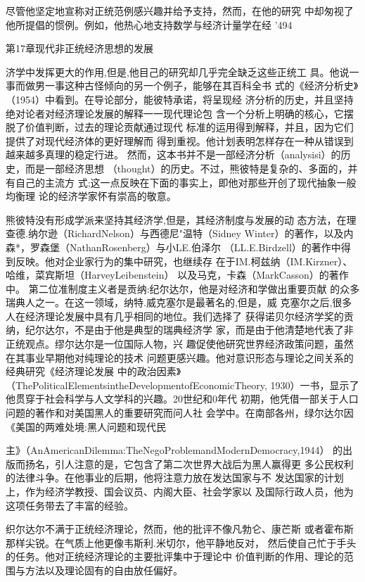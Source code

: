 尽管他坚定地宣称对正统范例感兴趣并给予支持，然而，在他的研究
中却匆视了他所提倡的惯例。例如，他热心地支持数学与经济计量学在经
'494


第17章现代非正统经济思想的发展


济学中发挥更大的作用,但是,他目己的研究却几乎完全缺乏这些正统工
具。他说一事而做男一事这种古怪倾向的另一个例子，能够在其百科全书
式的《经济分析史》（1954）中看到。在导论部分，能彼特承诺，将呈现经
济分析的历史，并且坚持绝对论者对经济理论发展的解释一一现代理论包
含一个分析上明确的核心，它摆脱了价值判断，过去的理论贡献通过现代
标准的运用得到解释，并且，因为它们提供了对现代经济体的更好理解而
得到重视。他计划表明怎样存在一种从错误到越来越多真理的稳定行进。
然而，这本书并不是一部经济分析（analysisi）的历史，而是一部经济思想
（thought）的历史。不过，熊彼特是复杂的、多面的，并有自己的主流方
式;这一点反映在下面的事实上，即他对那些开创了现代抽象一般均衡理
论的经济学家怀有崇高的敬意。

熊彼特没有形成学派来坚持其经济学,但是，其经济制度与发展的动
态方法，在理查德.纳尔逊（RichardNelson）与西德尼"温特（Sidney
Winter）的著作，以及内森*，罗森堡（NathanRosenberg）与小LE.伯泽尔
（LL.E.Birdzell）的著作中得到反映。他对企业家行为的集中研究，也继续存
在于IM.柯兹纳（IM.Kirzner）、哈维，菜宾斯坦（HarveyLeibenstein）
以及马克，卡森（MarkCasson）的著作中。
第二位准制度主义者是贡纳:纪尔达尔，他是对经济和学做出重要页献
的众多瑞典人之一。在这一领域，纳特.威克塞尔是最著名的,但是，威
克塞尔之后,很多人在经济理论发展中具有几乎相同的地位。我们选择了
获得诺贝尔经济学奖的贡纳，纪尔达尔，不是由于他是典型的瑞典经济学
家，而是由于他清楚地代表了非正统观点。缪尔达尔是一位国际人物，兴
趣促使他研究世界经济政策问题，虽然在其事业早期他对纯理论的技术
问题更感兴趣。他对意识形态与理论之间关系的经典研究《经济理论发展
中的政治因素》（ThePoliticalElementsintheDevelopmentofEconomicTheory,
1930）一书，显示了他贯穿于社会科学与人文学科的兴趣。20世纪和0年代
初期，他凭借一部关于人口问题的著作和对美国黑人的重要研究而问人社
会学中。在南部各州，绿尔达尔因《美国的两难处境:黑人问题和现代民

主》（AnAmericanDilemma:TheNegoProblemandModernDemocracy,1944）
的出版而扬名，引人注意的是，它包含了第二次世界大战后为黑人赢得更
多公民权利的法律斗争。在他事业的后期，他将注意力放在发达国家与不
发达国家的计划上，作为经济学教授、国会议员、内阁大臣、社会学家以
及国际行政人员，他为这项任务带去了丰富的经验。

织尔达尔不满于正统经济理论，然而，他的批评不像凡勃仑、康芒斯
或者霍布斯那样尖锐。在气质上他更像韦斯利.米切尔，他平静地反对，
然后使自己忙于手头的任务。他对正统经济理论的主要批评集中于理论中
价值判断的作用、理论的范围与方法以及理论固有的自由放任偏好。

